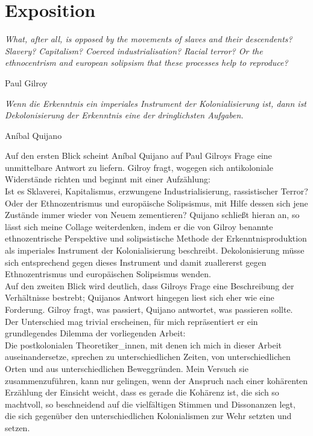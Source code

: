 \section{Exposition}
\epigraph{
  \textit{What, after all, is opposed by the movements of slaves and their descendents?
Slavery? Capitalism? Coerced industrialisation? Racial terror?
Or the ethnocentrism and european solipsism that these processes help to reproduce?
}}{Paul Gilroy\footnotemark} 

\epigraph{\textit{
    \textit{Wenn die Erkenntnis ein imperiales Instrument der Kolonialisierung
      ist, dann ist Dekolonisierung der Erkenntnis eine der dringlichsten
    Aufgaben.}
  }}{Aníbal Quijano\footnotemark}

Auf den ersten Blick scheint Aníbal Quijano auf Paul Gilroys Frage eine
unmittelbare Antwort zu liefern. Gilroy fragt, wogegen sich antikoloniale
Widerstände richten und beginnt mit einer Aufzählung:\\
Ist es Sklaverei,
Kapitalismus, erzwungene Industrialisierung, rassistischer Terror? Oder der
Ethnozentrismus und europäische Solipsismus, mit Hilfe dessen sich jene
Zustände immer wieder von Neuem zementieren? Quijano schließt hieran an, so
lässt sich meine Collage weiterdenken, indem er die von Gilroy benannte
ethnozentrische Perspektive und solipsistische Methode der Erkenntnisproduktion
als imperiales Instrument der Kolonialisierung beschreibt. Dekolonisierung
müsse sich entsprechend gegen dieses Instrument und damit zuallererst gegen
Ethnozentrismus und europäischen Solipsismus wenden.\\
Auf den zweiten Blick wird deutlich, dass Gilroys Frage eine Beschreibung der
Verhältnisse bestrebt; Quijanos Antwort hingegen liest sich eher wie eine
Forderung. Gilroy fragt, was passiert, Quijano antwortet, was passieren sollte.
Der Unterschied mag trivial erscheinen, für mich repräsentiert er ein
grundlegendes Dilemma der vorliegenden Arbeit:\\
Die postkolonialen Theoretiker\_innen, mit denen ich mich in dieser Arbeit
auseinandersetze, sprechen zu unterschiedlichen Zeiten, von unterschiedlichen
Orten und aus unterschiedlichen Beweggründen. Mein Versuch sie
zusammenzuführen, kann nur gelingen, wenn der Anspruch nach einer kohärenten
Erzählung der Einsicht weicht, dass es gerade die Kohärenz ist, die sich so
machtvoll, so beschneidend auf die vielfältigen Stimmen und Dissonanzen legt,
die sich gegenüber den unterschiedlichen Kolonialismen zur Wehr setzten und
setzen.\\

